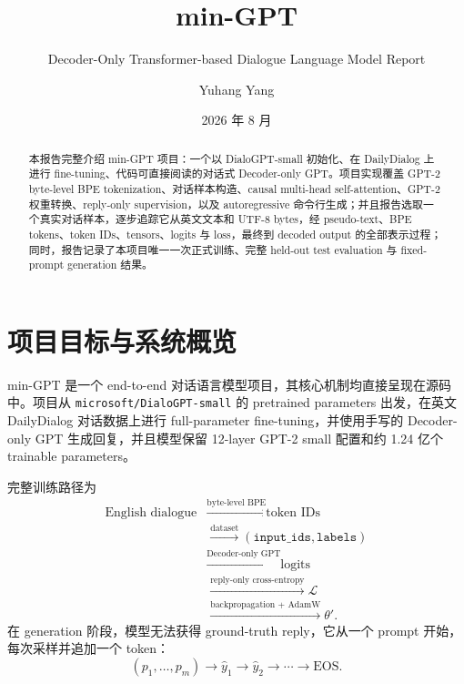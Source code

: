 \documentclass[12pt]{article}
\title{min-GPT}
\subtitle{Decoder-Only Transformer-based Dialogue Language Model Report}
\author{Yuhang Yang}
\date{2026 年 8 月}
\newcommand{\EOS}{\mathrm{EOS}}
\begin{document}
\maketitle

\begin{abstract}
本报告完整介绍 min-GPT 项目：一个以 DialoGPT-small 初始化、在 DailyDialog 上进行 fine-tuning、代码可直接阅读的对话式 Decoder-only GPT。项目实现覆盖 GPT-2 byte-level BPE tokenization、对话样本构造、causal multi-head self-attention、GPT-2 权重转换、reply-only supervision，以及 autoregressive 命令行生成；并且报告选取一个真实对话样本，逐步追踪它从英文文本和 UTF-8 bytes，经 pseudo-text、BPE tokens、token IDs、tensors、logits 与 loss，最终到 decoded output 的全部表示过程；同时，报告记录了本项目唯一一次正式训练、完整 held-out test evaluation 与 fixed-prompt generation 结果。
\end{abstract}

\section{项目目标与系统概览}

min-GPT 是一个 end-to-end 对话语言模型项目，其核心机制均直接呈现在源码中。项目从 \texttt{microsoft/DialoGPT-small} 的 pretrained parameters 出发，在英文 DailyDialog 对话数据上进行 full-parameter fine-tuning，并使用手写的 Decoder-only GPT 生成回复，并且模型保留 12-layer GPT-2 small 配置和约 1.24 亿个 trainable parameters。

完整训练路径为
\begin{equation*}
\begin{aligned}
\text{English dialogue}
&\xrightarrow{\text{byte-level BPE}} \text{token IDs}\\
&\xrightarrow{\text{dataset}} (\texttt{input\_ids},\texttt{labels})\\
&\xrightarrow{\text{Decoder-only GPT}} \text{logits}\\
&\xrightarrow{\text{reply-only cross-entropy}} \mathcal L\\
&\xrightarrow{\text{backpropagation + AdamW}} \theta'.
\end{aligned}
\end{equation*}
在 generation 阶段，模型无法获得 ground-truth reply，它从一个 prompt 开始，每次采样并追加一个 token：
\begin{equation}
(p_1,\ldots,p_m)
\longrightarrow \hat y_1
\longrightarrow \hat y_2
\longrightarrow \cdots
\longrightarrow \EOS .
\end{equation}
\end{document}
